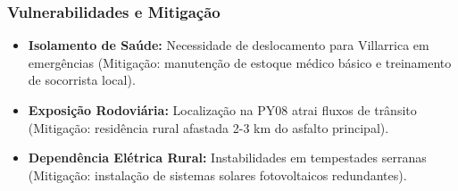 \subsubsection{Vulnerabilidades e
Mitigação}

\begin{itemize}
\tightlist
\item
  \textbf{Isolamento de Saúde:} Necessidade de deslocamento para
  Villarrica em emergências (Mitigação: manutenção de estoque médico
  básico e treinamento de socorrista local).
\item
  \textbf{Exposição Rodoviária:} Localização na PY08 atrai fluxos de
  trânsito (Mitigação: residência rural afastada 2-3 km do asfalto
  principal).
\item
  \textbf{Dependência Elétrica Rural:} Instabilidades em tempestades
  serranas (Mitigação: instalação de sistemas solares fotovoltaicos
  redundantes).
\end{itemize}

